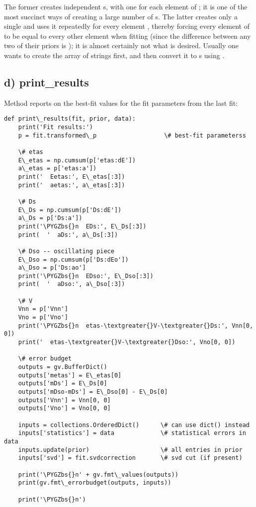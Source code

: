 \documentclass[letterpaper,10pt,english]{sphinxmanual}
\def\PYGZbs{\char`\\}
\begin{document}
The former creates  independent s, with one for each element
of ; it is one of the most succinct ways of creating a large number of
s. The latter creates only a single  and uses it repeatedly for
every element , thereby forcing every element of   to be equal
to every other element when fitting (since the difference between any two of
their priors is ); it is almost certainly not what is desired.
Usually one wants to create the array of strings first, and then convert it to
s using .


\subsection{d) print\_results}
\label{corrfitter:id6}
Method  reports on the best-fit values
for the fit parameters from the last fit:

\begin{Verbatim}[commandchars=\\\{\}]
def print\_results(fit, prior, data):
    print('Fit results:')
    p = fit.transformed\_p                   \# best-fit parameterss

    \# etas
    E\_etas = np.cumsum(p['etas:dE'])
    a\_etas = p['etas:a'])
    print('  Eetas:', E\_etas[:3])
    print('  aetas:', a\_etas[:3])

    \# Ds
    E\_Ds = np.cumsum(p['Ds:dE'])
    a\_Ds = p['Ds:a'])
    print('\PYGZbs{}n  EDs:', E\_Ds[:3])
    print(  '  aDs:', a\_Ds[:3])

    \# Dso -- oscillating piece
    E\_Dso = np.cumsum(p['Ds:dEo'])
    a\_Dso = p['Ds:ao']
    print('\PYGZbs{}n  EDso:', E\_Dso[:3])
    print(  '  aDso:', a\_Dso[:3])

    \# V
    Vnn = p['Vnn']
    Vno = p['Vno']
    print('\PYGZbs{}n  etas-\textgreater{}V-\textgreater{}Ds:', Vnn[0, 0])
    print('  etas-\textgreater{}V-\textgreater{}Dso:', Vno[0, 0])

    \# error budget
    outputs = gv.BufferDict()
    outputs['metas'] = E\_etas[0]
    outputs['mDs'] = E\_Ds[0]
    outputs['mDso-mDs'] = E\_Dso[0] - E\_Ds[0]
    outputs['Vnn'] = Vnn[0, 0]
    outputs['Vno'] = Vno[0, 0]

    inputs = collections.OrderedDict()      \# can use dict() instead
    inputs['statistics'] = data             \# statistical errors in data
    inputs.update(prior)                    \# all entries in prior
    inputs['svd'] = fit.svdcorrection       \# svd cut (if present)

    print('\PYGZbs{}n' + gv.fmt\_values(outputs))
    print(gv.fmt\_errorbudget(outputs, inputs))

    print('\PYGZbs{}n')
\end{Verbatim}
\end{document}
